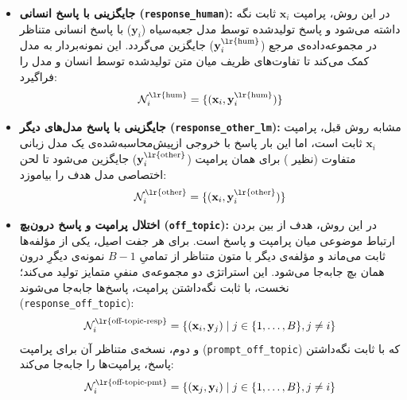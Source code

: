 \begin{itemize}
    \item \textbf{جایگزینی با پاسخ انسانی (\texttt{response\_human}):} 
    در این روش، پرامپت $\mathbf{x}_i$ ثابت نگه داشته می‌شود و پاسخ تولیدشده توسط مدل جعبه‌سیاه ($\mathbf{y}_i$) با پاسخ انسانی متناظر در مجموعه‌داده‌ی مرجع ($\mathbf{y}^{\text{\lr{hum}}}_i$) جایگزین می‌گردد. این نمونه‌بردار به مدل کمک می‌کند تا تفاوت‌های ظریف میان متن تولیدشده توسط انسان و مدل را فراگیرد:
    \begin{equation}
        \mathcal{N}^{\text{\lr{hum}}}_i = \{ (\mathbf{x}_i, \mathbf{y}^{\text{\lr{hum}}}_i) \}
    \end{equation}

    \item \textbf{جایگزینی با پاسخ مدل‌های دیگر (\texttt{response\_other\_lm}):}
    مشابه روش قبل، پرامپت $\mathbf{x}_i$ ثابت است، اما این بار پاسخ با خروجی ازپیش‌محاسبه‌شده‌ی یک مدل زبانی متفاوت (نظیر ) برای همان پرامپت ($\mathbf{y}^{\text{\lr{other}}}_i$) جایگزین می‌شود تا  لحن اختصاصی مدل هدف را بیاموزد:
    \begin{equation}
        \mathcal{N}^{\text{\lr{other}}}_i = \{ (\mathbf{x}_i, \mathbf{y}^{\text{\lr{other}}}_i) \}
    \end{equation}

    \item \textbf{اختلال پرامپت و پاسخ درون‌بچ (\texttt{off\_topic}):}
    در این روش، هدف از بین بردن ارتباط موضوعی میان پرامپت و پاسخ است. برای هر جفت اصیل، یکی از مؤلفه‌ها ثابت می‌ماند و مؤلفه‌ی دیگر با متون متناظر از تمامیِ $B-1$ نمونه‌ی دیگرِ درون همان بچ جابه‌جا می‌شود. این استراتژی دو مجموعه‌ی منفیِ متمایز تولید می‌کند؛ نخست، با ثابت نگه‌داشتن پرامپت، پاسخ‌ها جابه‌جا می‌شوند (\texttt{response\_off\_topic}):
    \begin{equation}
        \mathcal{N}^{\text{\lr{off-topic-resp}}}_i = \left\{ (\mathbf{x}_i, \mathbf{y}_j) \;\middle|\; j \in \{1, \dots, B\}, j \neq i \right\}
    \end{equation}
    و دوم، نسخه‌ی متناظر آن برای پرامپت (\texttt{prompt\_off\_topic}) که با ثابت نگه‌داشتن پاسخ، پرامپت‌ها را جابه‌جا می‌کند:
    \begin{equation}
        \mathcal{N}^{\text{\lr{off-topic-pmt}}}_i = \left\{ (\mathbf{x}_j, \mathbf{y}_i) \;\middle|\; j \in \{1, \dots, B\}, j \neq i \right\}
    \end{equation}


\end{itemize}
